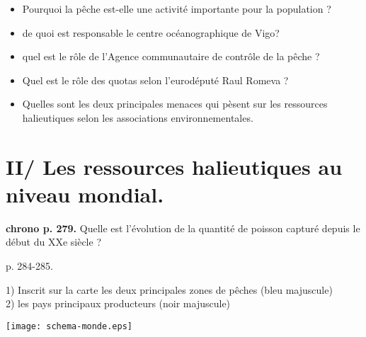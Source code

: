 \documentclass{beamer}
\begin{document}
 \begin{frame}
\begin{itemize}
  \item Pourquoi la pêche est-elle une activité importante pour la population ? %
  \item de quoi est responsable le centre océanographique de Vigo? %
  \item quel est le rôle de l'Agence communautaire de contrôle de la pêche ? %
  \item Quel est le rôle des quotas selon l'eurodéputé Raul Romeva ? %
  \item Quelles sont les deux principales menaces qui pèsent sur les ressources halieutiques selon les associations environnementales. %
  \end{itemize}
 \end{frame}


 \section{II/ Les ressources halieutiques au niveau mondial.}

\begin{frame}
\textbf{chrono p. 279.} Quelle est l'évolution de la quantité de poisson capturé depuis le début du XXe siècle ? \\
\end{frame}


\begin{frame}
p. 284-285.

\begin{minipage}{3cm}
 1) Inscrit sur la carte les deux principales zones de pêches (bleu majuscule)\\
 2) les pays principaux producteurs (noir majuscule)
 \end{minipage}
 \begin{minipage}{6cm}
 \texttt{[image: schema-monde.eps]}
 \end{minipage}

\end{frame}
\end{document}
